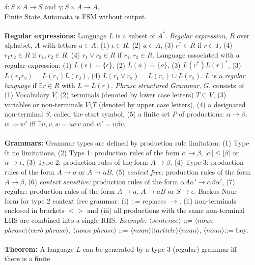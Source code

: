 $\delta: S \times A \rightarrow S$ and
$\gamma: S \times A \rightarrow A$.\\
Finite State Automata is FSM without output.\\
\\
{\bf Regular expressions:}
Language $L$ is a subset of $A^*$.
\emph{Regular expression}, $R$ over alphabet, $A$ with letters 
$a \in A$: (1) $ \epsilon \in R$,
(2) $a \in A$, (3) $r^* \in R$ if $r \in T$,
(4) $r_1 r_2 \in R$ if $r_1 , r_2 \in R$,
(4) $r_1 \vee r_2 \in R$ if $r_1 , r_2 \in R$.
Language associated with a regular expression: (1) $ L(\epsilon)=\{ \epsilon \}$,
(2) $L(a)= \{a\}$, (3) $L(r^*) L(r)^*$,
(3) $L(r_1 r_2)= L(r_1 ) L(r_2)$,
(4) $L(r_1 \vee r_2) = L(r_1) \cup L(r_2)$.
$L$ is a \emph{regular language} if $\exists r \in R$ with $L=L(r)$.
\emph{Phrase structured Grammar}, 
$G$, consists of (1) Vocabulary $V$, (2) terminals (denoted by lower case letters) 
$T \subseteq V$, (3) variables or non-terminals $V \setminus T$ (denoted
by upper case letters), (4) a designated non-terminal $S$, called the start symbol, (5)
a finite set $P$ of productions: $\alpha \rightarrow \beta$.
$w \Rightarrow w'$ iff $\exists u,v, w=u \alpha v$ and $w'= u \beta v$.
\\
\\
{\bf Grammars:}
Grammar types are defined by production rule limitation: (1) Type 0: no limitations,
(2) Type 1: production rules of the form
$\alpha \rightarrow \beta$, $|\alpha| \leq |\beta|$ or
$\alpha \rightarrow \epsilon$,
(3) Type 2: production rules of the form $A \rightarrow \beta$,
(4) Type 3: production rules of the form
$A \rightarrow a$ or $A \rightarrow aB$,
(5) \emph{context free:} production rules of the form $A \rightarrow \beta$,
(6) \emph{context sensitive:} production rules of the form
$\alpha A \alpha' \rightarrow \alpha \beta \alpha'$,
(7) regular: production rules of the form
$A \rightarrow a$, $A \rightarrow aB$ or $S \rightarrow \epsilon$.
Backus-Naur form for type 2 context free grammar:
(i) ::= replaces $\rightarrow$,
(ii) non-terminals enclosed in brackets $<>$ and
(iii) all productions with the same non-terminal
LHS are combined into a single RHS.
\emph{Example:} 
$\langle sentence  \rangle$ ::= 
$\langle noun$ $phrase \rangle\langle verb$ $phrase \rangle$, 
$\langle noun$ $phrase \rangle$ ::= 
$\langle noun \rangle|\langle article \rangle\langle noun \rangle$,
$\langle noun \rangle$::= boy.
\\
\\
{\bf Theorem:}
A language $L$ can be generated by a type 3 (regular) grammar iff there is a finite
